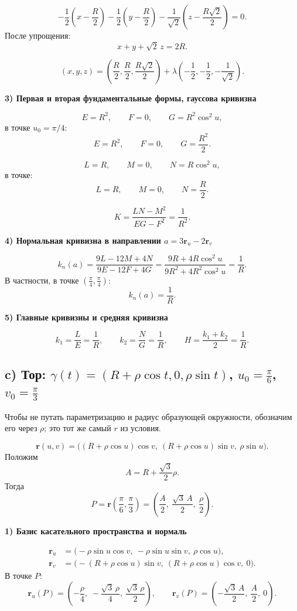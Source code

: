 \documentclass[12pt,a4paper]{article}
\begin{document}
\[
-\frac12\left(x-\frac R2\right)-\frac12\left(y-\frac R2\right)-\frac1{\sqrt2}\left(z-\frac{R\sqrt2}{2}\right)=0.
\]
После упрощения:
\[
x+y+\sqrt2\,z=2R.
\]

\[
(x,y,z)=\left(\frac R2,\frac R2,\frac{R\sqrt2}{2}\right)+
\lambda\left(-\frac12,-\frac12,-\frac1{\sqrt2}\right).
\]

\textbf{3) Первая и вторая фундаментальные формы, гауссова кривизна}

\[
E=R^2,\qquad F=0,\qquad G=R^2\cos^2 u,
\]
в точке $u_0=\pi/4$:
\[
E=R^2,\qquad F=0,\qquad G=\frac{R^2}{2}.
\]

\[
L=R,\qquad M=0,\qquad N=R\cos^2 u,
\]
в точке:
\[
L=R,\qquad M=0,\qquad N=\frac R2.
\]

\[
K=\frac{LN-M^2}{EG-F^2}=\frac1{R^2}.
\]

\textbf{4) Нормальная кривизна в направлении $a=3\mathbf r_u-2\mathbf r_v$}

\[
k_n(a)=\frac{9L-12M+4N}{9E-12F+4G}
=\frac{9R+4R\cos^2 u}{9R^2+4R^2\cos^2 u}
=\frac1R.
\]
В частности, в точке $\left(\frac{\pi}{4},\frac{\pi}{4}\right)$:
\[
k_n(a)=\frac1R.
\]

\textbf{5) Главные кривизны и средняя кривизна}

\[
k_1=\frac{L}{E}=\frac1R,\qquad k_2=\frac{N}{G}=\frac1R,\qquad
H=\frac{k_1+k_2}{2}=\frac1R.
\]

\subsection*{c) Тор: $\gamma(t) = (R+\rho\cos t, 0, \rho\sin t)$, $u_0=\frac{\pi}{6}$, $v_0=\frac{\pi}{3}$}

Чтобы не путать параметризацию и радиус образующей окружности, обозначим его через $\rho$; это тот же самый $r$ из условия.

\[
\mathbf r(u,v)=\bigl((R+\rho\cos u)\cos v,\ (R+\rho\cos u)\sin v,\ \rho\sin u\bigr).
\]
Положим
\[
A=R+\frac{\sqrt3}{2}\rho.
\]
Тогда
\[
P=\mathbf r\!\left(\frac{\pi}{6},\frac{\pi}{3}\right)=
\left(\frac A2,\ \frac{\sqrt3\,A}{2},\ \frac{\rho}{2}\right).
\]

\textbf{1) Базис касательного пространства и нормаль}

\begin{align*}
\mathbf r_u&=\bigl(-\rho\sin u\cos v,\ -\rho\sin u\sin v,\ \rho\cos u\bigr),\\
\mathbf r_v&=\bigl(-(R+\rho\cos u)\sin v,\ (R+\rho\cos u)\cos v,\ 0\bigr).
\end{align*}
В точке $P$:
\[
\mathbf r_u(P)=\left(-\frac{\rho}{4},\ -\frac{\sqrt3\,\rho}{4},\ \frac{\sqrt3\,\rho}{2}\right),\qquad
\mathbf r_v(P)=\left(-\frac{\sqrt3\,A}{2},\ \frac A2,\ 0\right).
\]
\end{document}
